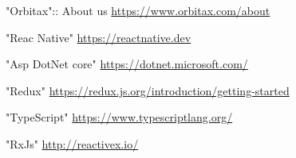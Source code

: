 
\begin{thebibliography}{9}
"Orbitax":: About us \href{https://www.orbitax.com/about/}{https://www.orbitax.com/about}

"Reac Native" \href{https://reactnative.dev/}{https://reactnative.dev}

"Asp DotNet core" \href{https://dotnet.microsoft.com/}{https://dotnet.microsoft.com/}

"Redux" \href{https://redux.js.org/introduction/getting-started}{https://redux.js.org/introduction/getting-started}

"TypeScript" \href{https://www.typescriptlang.org/}{https://www.typescriptlang.org/}

"RxJs" \href{http://reactivex.io/}{http://reactivex.io/}

\end{thebibliography}